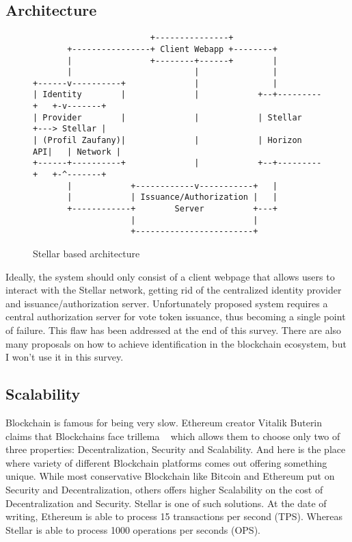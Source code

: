 \documentclass[runningheads]{llncs}
\begin{document}
\subsection{Architecture}
\begin{figure}
\begin{verbatim}
                        +---------------+
       +----------------+ Client Webapp +--------+
       |                +--------+------+        |
       |                         |               |
+------v----------+              |               |
| Identity        |              |            +--+---------+   +-v-------+
| Provider        |              |            | Stellar    +---> Stellar |
| (Profil Zaufany)|              |            | Horizon API|   | Network |
+------+----------+              |            +--+---------+   +-^-------+
       |            +------------v-----------+   |
       |            | Issuance/Authorization |   |
       +------------+        Server          +---+
                    |                        |
                    +------------------------+
\end{verbatim}
\caption{Stellar based architecture}
\label{fig:ascii-box}
\end{figure} 

Ideally, the system should only consist of a client webpage that allows users to interact with the Stellar network, getting rid of the centralized identity provider and issuance/authorization server. Unfortunately proposed system requires a central authorization server for vote token issuance, thus becoming a single point
of failure. This flaw has been addressed at the end of this survey. There are also many proposals on how to achieve identification in the blockchain ecosystem, but I won’t use it in this survey.

\subsection{Scalability}

Blockchain is famous for being very slow. Ethereum creator Vitalik Buterin claims that Blockchains face trillema ~\cite{ethereum} which allows them to choose only two of three properties: Decentralization, Security and Scalability. And here is the place where variety of different Blockchain platforms comes out offering something unique. While most conservative Blockchain like Bitcoin and Ethereum put on Security and Decentralization, others offers higher Scalability on the cost of Decentralization and Security. Stellar is one of such solutions. 
At the date of writing, Ethereum is able to process 15 transactions per second (TPS). Whereas Stellar is able to process 1000 operations per seconds (OPS). 
\end{document}
